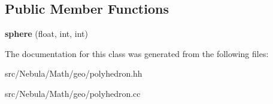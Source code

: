 \subsection*{\-Public \-Member \-Functions}
\begin{DoxyCompactItemize}
\item 
\hypertarget{classmath_1_1geo_1_1sphere_ad30f9edddc96ef9c7a4062e79694556d}{{\bfseries sphere} (float, int, int)}\label{classmath_1_1geo_1_1sphere_ad30f9edddc96ef9c7a4062e79694556d}

\end{DoxyCompactItemize}


\-The documentation for this class was generated from the following files\-:\begin{DoxyCompactItemize}
\item 
src/\-Nebula/\-Math/geo/polyhedron.\-hh\item 
src/\-Nebula/\-Math/geo/polyhedron.\-cc\end{DoxyCompactItemize}
